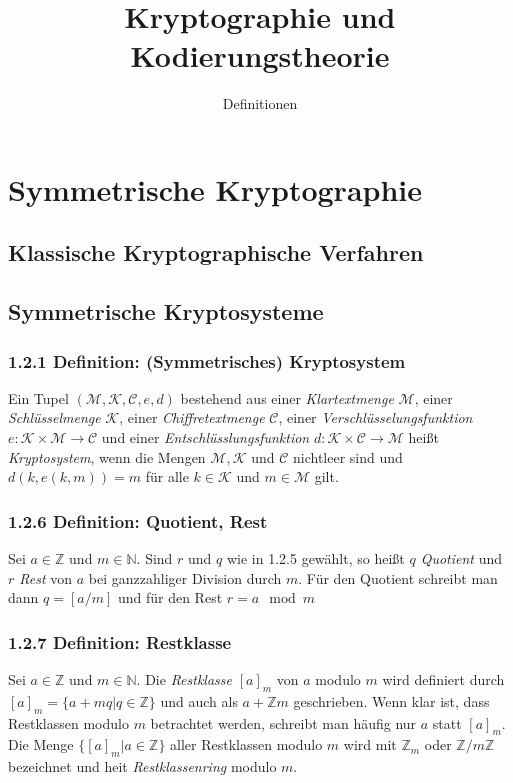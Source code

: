 \documentclass[12pt,a4paper]{scrartcl}
\begin{document}
    \title{Kryptographie und Kodierungstheorie} \subtitle{Definitionen} \date{}
    \maketitle
    \tableofcontents
    \newpage
    \section{Symmetrische Kryptographie}
        \subsection{Klassische Kryptographische Verfahren}
        \subsection{Symmetrische Kryptosysteme}
            \subsubsection*{1.2.1 Definition: (Symmetrisches) Kryptosystem}
                Ein Tupel $(\mathcal{M} ,\mathcal{K} ,\mathcal{C} , e, d)$ bestehend aus einer \emph{Klartextmenge} $\mathcal{M}$, einer \emph{Schlüsselmenge} $\mathcal{K}$, einer \emph{Chiffretextmenge} $\mathcal{C}$, einer \emph{Verschlüsselungsfunktion} $e:\mathcal{K} \times \mathcal{M} \rightarrow \mathcal{C}$ und einer \emph{Entschlüsslungsfunktion} $d:\mathcal{K}  \times \mathcal{C} \rightarrow \mathcal{M} $ heißt \emph{Kryptosystem}, wenn die Mengen $\mathcal{M} ,\mathcal{K} $ und $\mathcal{C} $ nichtleer sind und $d(k,e(k,m))=m $ für alle $k \in \mathcal{K} $ und $m \in \mathcal{M} $ gilt.
            \subsubsection*{1.2.6 Definition: Quotient, Rest}
                Sei $a \in \mathbb{Z}$ und $m \in \mathbb{N}$. Sind $r$ und $q$ wie in 1.2.5 gewählt, so heißt \emph{$q$ Quotient} und \emph{$r$ Rest} von $a$ bei ganzzahliger Division durch $m$. Für den Quotient schreibt man dann $q = [a/m]$ und für den Rest $r=a \mod m$
            \subsubsection*{1.2.7 Definition: Restklasse}
                Sei $a \in \mathbb{Z}$ und $m \in \mathbb{N}$. Die \emph{Restklasse} $[a]_m$ von $a$ modulo $m$ wird definiert durch $[a]_m = \lbrace a + mq|q \in \mathbb{Z} \rbrace$ und auch als $a + \mathbb{Z}m$ geschrieben. Wenn klar ist, dass Restklassen modulo $m$ betrachtet werden, schreibt man häufig nur $a$ statt $[a]_m$. Die Menge $\lbrace [a]_m | a \in \mathbb{Z} \rbrace$ aller Restklassen modulo $m$ wird mit $\mathbb{Z}_m$ oder $\mathbb{Z}/m\mathbb{Z}$ bezeichnet und heit \emph{Restklassenring} modulo $m$.
\end{document}
